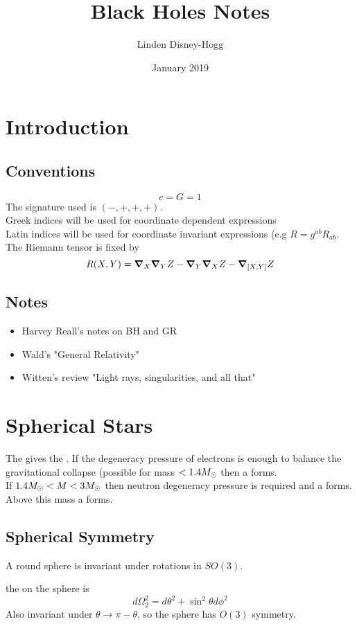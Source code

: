 \documentclass{article}
\title{Black Holes Notes}
\author{Linden Disney-Hogg}
\date{January 2019}
\begin{document}
\maketitle
\tableofcontents

\section{Introduction}
\subsection{Conventions}
\[
c = G = 1
\]
The signature used is $(-,+,+,+)$. \\
Greek indices will be used for coordinate dependent expressions \\
Latin indices will be used for coordinate invariant expressions (e.g $R=g^{ab}R_{ab}$.\\ 
The Riemann tensor is fixed by 
\[
R(X,Y) = \grad_X \grad_Y Z - \grad_Y \grad_X Z - \grad_{\comm[X]{Y}} Z
\]
\subsection{Notes}
\begin{itemize}
    \item Harvey Reall's notes on BH and GR 
    \item Wald's "General Relativity"
    \item Witten's review "Light rays, singularities, and all that"
\end{itemize}

\section{Spherical Stars}
The  gives the . If the degeneracy pressure of electrons is enough to balance the gravitational collapse (possible for mass  $<1.4 \msolar$ then a  forms.\\
If $1.4 \msolar < M < 3 \msolar$ then neutron degeneracy pressure is required and a  forms. Above this mass a  forms. 

\subsection{Spherical Symmetry}
A round sphere is invariant under rotations in $SO(3)$. 

\begin{definition}
the  on the sphere is 
\[
d\Omega_2^2 = d\theta^2 + \sin^2\theta d\phi^2
\]
Also invariant under $\theta \to \pi-\theta$, so the sphere has $O(3)$ symmetry. 
\end{definition}
\end{document}
